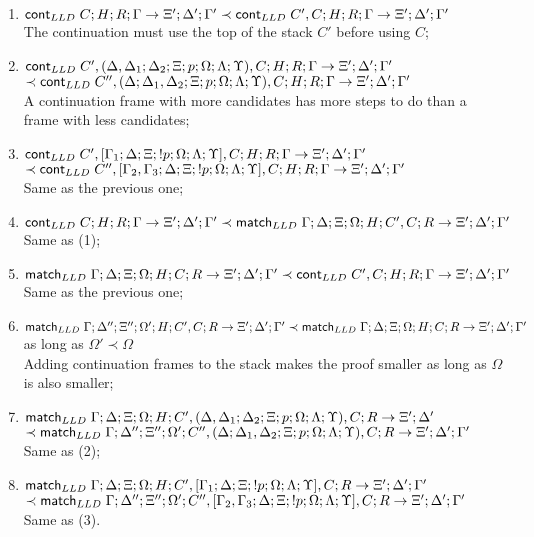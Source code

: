 \begin{enumerate}
   \item $\mathsf{cont}_{LLD} \; C; H; R; \Gamma \rightarrow \Xi'; \Delta'; \Gamma' \prec \mathsf{cont}_{LLD} \; C', C; H; R; \Gamma \rightarrow \Xi'; \Delta'; \Gamma'$\\
   The continuation must use the top of the stack $C'$ before using $C$;
   \item $\mathsf{cont}_{LLD} \; C', (\Delta, \Delta_1; \Delta_2; \Xi; p; \Omega; \Lambda; \Upsilon), C; H; R; \Gamma \rightarrow \Xi'; \Delta'; \Gamma'$\\
   \hspace*{1cm}$\prec \mathsf{cont}_{LLD} \; C'', (\Delta; \Delta_1, \Delta_2; \Xi; p; \Omega; \Lambda; \Upsilon), C; H; R; \Gamma \rightarrow \Xi'; \Delta'; \Gamma'$\\
   A continuation frame with more candidates has more steps to do than a frame with less candidates;
   \item $\mathsf{cont}_{LLD} \; C', [\Gamma_1; \Delta; \Xi; {!} p; \Omega; \Lambda; \Upsilon], C; H; R; \Gamma \rightarrow \Xi'; \Delta'; \Gamma'$\\
   \hspace*{1cm} $\prec \mathsf{cont}_{LLD} \; C'', [\Gamma_2, \Gamma_3; \Delta; \Xi; {!} p; \Omega; \Lambda; \Upsilon], C; H; R; \Gamma \rightarrow \Xi'; \Delta'; \Gamma'$\\
      Same as the previous one;
   \item $\mathsf{cont}_{LLD} \; C; H; R; \Gamma \rightarrow \Xi'; \Delta'; \Gamma' \prec \mathsf{match}_{LLD} \; \Gamma; \Delta; \Xi; \Omega; H; C', C; R \rightarrow \Xi'; \Delta'; \Gamma'$\\
   Same as (1);
   \item $\mathsf{match}_{LLD} \; \Gamma; \Delta; \Xi; \Omega; H; C; R \rightarrow \Xi'; \Delta'; \Gamma' \prec \mathsf{cont}_{LLD} \; C', C; H; R; \Gamma \rightarrow \Xi'; \Delta'; \Gamma'$\\
   Same as the previous one;
   \item $\mathsf{match}_{LLD} \; \Gamma; \Delta''; \Xi''; \Omega'; H; C', C; R \rightarrow \Xi'; \Delta'; \Gamma' \prec \mathsf{match}_{LLD} \; \Gamma; \Delta; \Xi; \Omega; H; C; R \rightarrow \Xi'; \Delta'; \Gamma'$ as long as $\Omega' \prec \Omega$\\
   Adding continuation frames to the stack makes the proof smaller as long as $\Omega$ is also smaller; 
   \item $\mathsf{match}_{LLD} \; \Gamma; \Delta; \Xi; \Omega; H; C', (\Delta, \Delta_1; \Delta_2; \Xi; p; \Omega; \Lambda; \Upsilon), C; R \rightarrow \Xi'; \Delta'$\\
   \hspace*{1cm} $\prec \mathsf{match}_{LLD} \; \Gamma; \Delta''; \Xi''; \Omega'; C'', (\Delta; \Delta_1, \Delta_2; \Xi; p; \Omega; \Lambda; \Upsilon), C; R \rightarrow \Xi'; \Delta'; \Gamma'$\\
   Same as (2);
   \item $\mathsf{match}_{LLD} \; \Gamma; \Delta; \Xi; \Omega; H; C', [\Gamma_1; \Delta; \Xi; {!} p; \Omega; \Lambda; \Upsilon], C; R \rightarrow \Xi'; \Delta'; \Gamma'$\\
   \hspace*{1cm} $\prec \mathsf{match}_{LLD} \; \Gamma; \Delta''; \Xi''; \Omega'; C'', [\Gamma_2, \Gamma_3; \Delta; \Xi; {!} p; \Omega; \Lambda; \Upsilon], C; R \rightarrow \Xi'; \Delta'; \Gamma'$\\
   Same as (3).
\end{enumerate}
